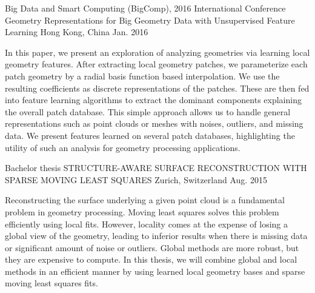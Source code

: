 

\begin{cventries}

  \cventry
    {Big Data and Smart Computing (BigComp), 2016 International Conference} %
    {Geometry Representations for Big Geometry Data with Unsupervised Feature Learning} %
    {Hong Kong, China } %
    {Jan. 2016} %
    {
      \begin{cvitems} %
        \item {
			In this paper, we present an exploration of analyzing geometries via learning local geometry features. After extracting local geometry patches, we parameterize each patch geometry by a radial basis function based interpolation. We use the resulting coefficients as discrete representations of the patches. These are then fed into feature learning algorithms to extract the dominant components explaining the overall patch database. This simple approach allows us to handle general representations such as point clouds or meshes with noises, outliers, and missing data. We present features learned on several patch databases, highlighting the utility of such an analysis for geometry processing applications.        
        }
      \end{cvitems}
    }

  \cventry
    {Bachelor thesis} %
    {STRUCTURE-AWARE SURFACE RECONSTRUCTION WITH SPARSE MOVING LEAST SQUARES} %
    {Zurich, Switzerland} %
    {Aug. 2015} %
    {
      \begin{cvitems} %
        \item {
        Reconstructing the surface underlying a given point cloud is a fundamental problem in geometry processing. Moving least squares solves this problem efficiently using local fits. However, locality comes at the expense of losing a global view of the geometry, leading to inferior results when there is missing data or significant amount of noise or outliers. Global methods are more robust, but they are expensive to compute. In this thesis, we will combine global and local methods in an efficient manner by using learned local geometry bases and sparse moving least squares fits.
        }
      \end{cvitems}
    }

\end{cventries}
